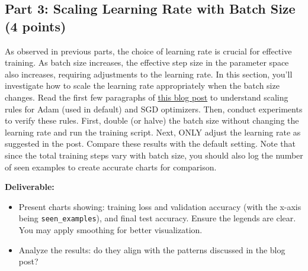 \documentclass[11pt, oneside]{article}   	%
\begin{document}
\subsection*{Part 3: Scaling Learning Rate with Batch Size (4 points)}

As observed in previous parts, the choice of learning rate is crucial for effective training. As batch size increases, the effective step size in the parameter space also increases, requiring adjustments to the learning rate. In this section, you'll investigate how to scale the learning rate appropriately when the batch size changes. Read the first few paragraphs of \href{https://www.cs.princeton.edu/~smalladi/blog/2024/01/22/SDEs-ScalingRules/}{this blog post} to understand scaling rules for Adam (used in default) and SGD optimizers. Then, conduct experiments to verify these rules. First, double (or halve) the batch size without changing the learning rate and run the training script. Next, ONLY adjust the learning rate as suggested in the post. Compare these results with the default setting. Note that since the total training steps vary with batch size, you should also log the number of seen examples to create accurate charts for comparison.


\noindent\textbf{Deliverable:}
\begin{itemize}
    \item Present charts showing: training loss and validation accuracy (with the x-axis being \texttt{seen\_examples}), and final test accuracy. Ensure the legends are clear. You may apply smoothing for better visualization. 
    \item Analyze the results: do they align with the patterns discussed in the blog post?
\end{itemize}
\end{document}
